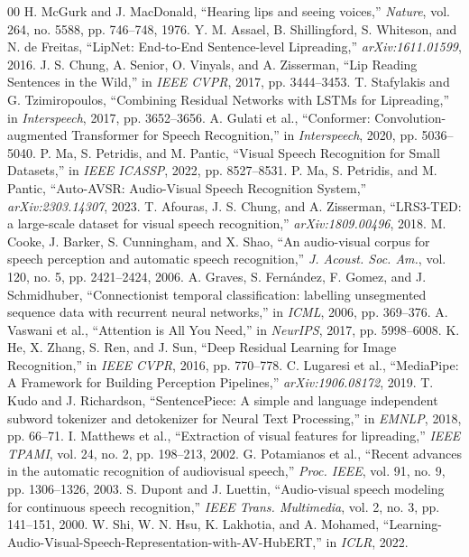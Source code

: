 \documentclass[conference,compsoc,10pt]{IEEEtran}
\begin{document}
\begin{thebibliography}{00}
 H. McGurk and J. MacDonald, ``Hearing lips and seeing voices,'' \textit{Nature}, vol. 264, no. 5588, pp. 746--748, 1976.
 Y. M. Assael, B. Shillingford, S. Whiteson, and N. de Freitas, ``LipNet: End-to-End Sentence-level Lipreading,'' \textit{arXiv:1611.01599}, 2016.
 J. S. Chung, A. Senior, O. Vinyals, and A. Zisserman, ``Lip Reading Sentences in the Wild,'' in \textit{IEEE CVPR}, 2017, pp. 3444--3453.
 T. Stafylakis and G. Tzimiropoulos, ``Combining Residual Networks with LSTMs for Lipreading,'' in \textit{Interspeech}, 2017, pp. 3652--3656.
 A. Gulati et al., ``Conformer: Convolution-augmented Transformer for Speech Recognition,'' in \textit{Interspeech}, 2020, pp. 5036--5040.
 P. Ma, S. Petridis, and M. Pantic, ``Visual Speech Recognition for Small Datasets,'' in \textit{IEEE ICASSP}, 2022, pp. 8527--8531.
 P. Ma, S. Petridis, and M. Pantic, ``Auto-AVSR: Audio-Visual Speech Recognition System,'' \textit{arXiv:2303.14307}, 2023.
 T. Afouras, J. S. Chung, and A. Zisserman, ``LRS3-TED: a large-scale dataset for visual speech recognition,'' \textit{arXiv:1809.00496}, 2018.
 M. Cooke, J. Barker, S. Cunningham, and X. Shao, ``An audio-visual corpus for speech perception and automatic speech recognition,'' \textit{J. Acoust. Soc. Am.}, vol. 120, no. 5, pp. 2421--2424, 2006.
 A. Graves, S. Fernández, F. Gomez, and J. Schmidhuber, ``Connectionist temporal classification: labelling unsegmented sequence data with recurrent neural networks,'' in \textit{ICML}, 2006, pp. 369--376.
 A. Vaswani et al., ``Attention is All You Need,'' in \textit{NeurIPS}, 2017, pp. 5998--6008.
 K. He, X. Zhang, S. Ren, and J. Sun, ``Deep Residual Learning for Image Recognition,'' in \textit{IEEE CVPR}, 2016, pp. 770--778.
 C. Lugaresi et al., ``MediaPipe: A Framework for Building Perception Pipelines,'' \textit{arXiv:1906.08172}, 2019.
 T. Kudo and J. Richardson, ``SentencePiece: A simple and language independent subword tokenizer and detokenizer for Neural Text Processing,'' in \textit{EMNLP}, 2018, pp. 66--71.
 I. Matthews et al., ``Extraction of visual features for lipreading,'' \textit{IEEE TPAMI}, vol. 24, no. 2, pp. 198--213, 2002.
 G. Potamianos et al., ``Recent advances in the automatic recognition of audiovisual speech,'' \textit{Proc. IEEE}, vol. 91, no. 9, pp. 1306--1326, 2003.
 S. Dupont and J. Luettin, ``Audio-visual speech modeling for continuous speech recognition,'' \textit{IEEE Trans. Multimedia}, vol. 2, no. 3, pp. 141--151, 2000.
 W. Shi, W. N. Hsu, K. Lakhotia, and A. Mohamed, ``Learning-Audio-Visual-Speech-Representation-with-AV-HubERT,'' in \textit{ICLR}, 2022.
\end{thebibliography}
\end{document}
